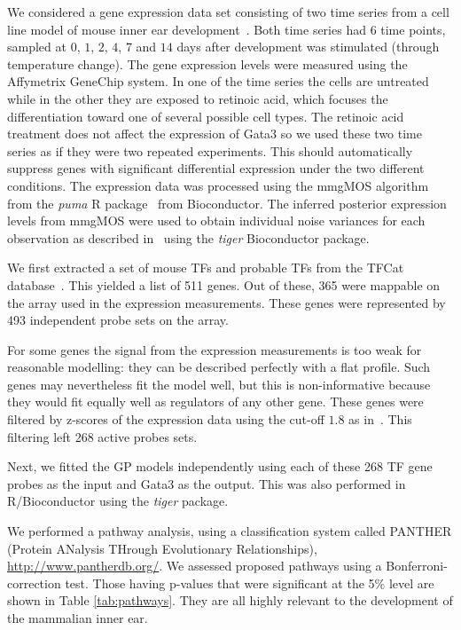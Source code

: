 \documentclass{article}
\begin{document}
We considered a gene expression data set consisting of two time series
from     a    cell     line     model    of     mouse    inner     ear
development~\cite{Helyer:model07}.  Both time  series had $6$ time points,
sampled at $0$, $1$, $2$, $4$, $7$ and $14$ days after development was
stimulated  (through temperature change).  The gene  expression levels
were measured  using the  Affymetrix GeneChip system.   In one  of the
time  series the  cells  are untreated  while  in the  other they  are
exposed to retinoic acid, which focuses the differentiation toward one
of several possible cell types.   The retinoic acid treatment does not
affect the expression of Gata3 so  we used these two time series as if
they  were  two   repeated  experiments.   This  should  automatically
suppress genes with significant  differential expression under the two
different  conditions.  The  expression data  was processed  using the
mmgMOS       algorithm        from       the       \emph{puma}       R
package~\cite{Liu:tractable04,Pearson:puma09}  from Bioconductor.  The
inferred  posterior expression  levels  from mmgMOS  were used  to
obtain individual  noise variances  for each observation  as described
in~\cite{Honkela:modelbased10}  using  the  \emph{tiger}  Bioconductor
package. %

We first extracted a set of  mouse TFs and probable TFs from the TFCat
database~\cite{Fulton2009}.  This yielded a list of 511 genes.  Out of
these,  365  were  mappable  on  the  array  used  in  the  expression
measurements.  These  genes were represented by  493 independent probe
sets on the array.

For some genes the signal from the expression measurements is too weak
for reasonable modelling: they can  be described perfectly with a flat
profile.  Such genes may nevertheless  fit the model well, but this is
non-informative because  they would fit equally well  as regulators of
any  other  gene.   These  genes  were filtered  by  z-scores  of  the
expression      data     using      the      cut-off     $1.8$      as
in~\cite{Honkela:modelbased10}.  This filtering left 268 active probes
sets.

Next, we fitted the GP models independently using each of these 268 TF
gene  probes as  the input  and Gata3  as the  output.  This  was also
performed in R/Bioconductor using the \emph{tiger} package.

We performed a pathway  analysis, using a classification system called
PANTHER   (Protein  ANalysis   THrough   Evolutionary  Relationships),
\url{http://www.pantherdb.org/}.  We  assessed proposed pathways using
a  Bonferroni-correction  test.    Those  having  p-values  that  were
significant    at    the    5\%    level   are    shown    in    Table
\ref{tab:pathways}. They are all highly relevant to the development of
the mammalian inner ear.
\end{document}
